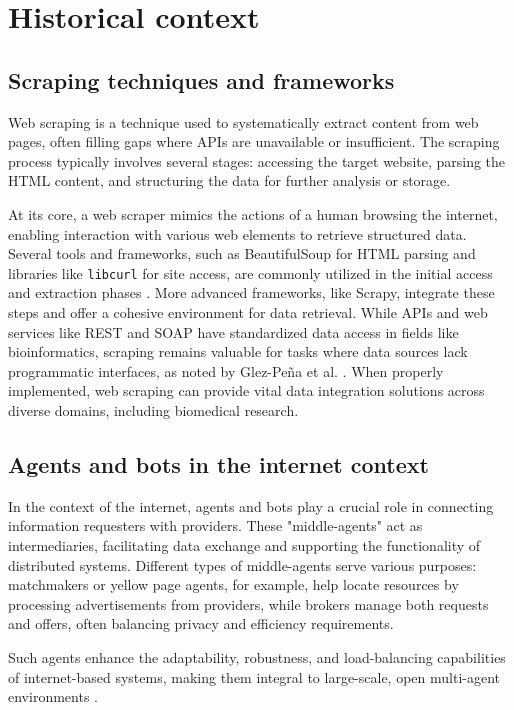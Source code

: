 \section{Historical context}
\subsection{Scraping techniques and frameworks}

Web scraping is a technique used to systematically extract content from web pages, often filling gaps where APIs are unavailable or insufficient. The scraping process typically involves several stages: accessing the target website, parsing the HTML content, and structuring the data for further analysis or storage. 

At its core, a web scraper mimics the actions of a human browsing the internet, enabling interaction with various web elements to retrieve structured data. Several tools and frameworks, such as BeautifulSoup for HTML parsing and libraries like \texttt{libcurl} for site access, are commonly utilized in the initial access and extraction phases \cite{1}. More advanced frameworks, like Scrapy, integrate these steps and offer a cohesive environment for data retrieval. While APIs and web services like REST and SOAP have standardized data access in fields like bioinformatics, scraping remains valuable for tasks where data sources lack programmatic interfaces, as noted by Glez-Peña et al. \cite{1}. When properly implemented, web scraping can provide vital data integration solutions across diverse domains, including biomedical research.


\subsection{Agents and bots in the internet context}
In the context of the internet, agents and bots play a crucial role in connecting information requesters with providers. These "middle-agents" act as intermediaries, facilitating data exchange and supporting the functionality of distributed systems. Different types of middle-agents serve various purposes: matchmakers or yellow page agents, for example, help locate resources by processing advertisements from providers, while brokers manage both requests and offers, often balancing privacy and efficiency requirements. 

Such agents enhance the adaptability, robustness, and load-balancing capabilities of internet-based systems, making them integral to large-scale, open multi-agent environments \cite{2}.

